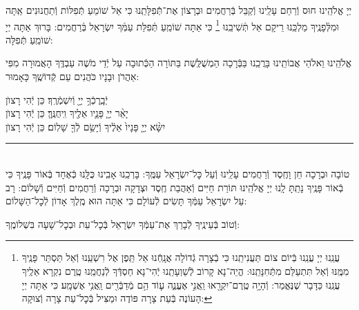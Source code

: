 \documentclass[twoside, openany, parskip=half, 11pt]{book}
\begin{document}
\weekdaysamalchus

יְיָ אֱלֹהֵֽינוּ חוּס וְֿרַחֵם עָלֵֽינוּ וְֿקַבֵּל בְּֿרַחֲמִים וּבְרָצוֹן אֶת־תְּֿֿפִלָּתֵֽנוּ כִּי אֵל שׁוֹמֵעַ תְּֿפִלּוֹת וְֿתַחֲנוּנִים אַֽתָּה וּמִלְּֿפָנֶֽיךָ מַלְכֵּֽנוּ רֵיקָם אַל תְּֿשִׁיבֵֽנוּ
\footnote{
עֲנֵֽנוּ יְיָ עֲנֵֽנוּ בְּֿיוֹם צוֹם תַּעֲנִיתֵֽנוּ כִּי בְֿצָרָה גְֿדוֹלָה אֲנָֽחְֿנוּ אַל תֵּֽפֶן אֶל רִשְׁעֵֽנוּ וְֿאַל תַּסְתֵּר פָּנֶֽיךָ מִמֶּֽנּוּ וְֿאַל תִּתְעַלַּם מִתְּֿחִנָּתֵֽנוּ: הֱיֵה־נָא קָרוֹב לְֿשַׁוְעָתֵֽנוּ יְֿהִי־נָא חַסְדְּֿךָ לְֿנַחֲמֵֽנוּ טֶֽרֶם נִקְרָא אֵלֶֽיךָ עֲנֵֽנוּ כַּדָּבָר שֶׁנֶּאֱמַר:
וְֿהָיָ֥ה טֶֽרֶם־יִקְרָ֖אוּ וַֽאֲנִ֣י אֶעֱנֶ֑ה ע֛וֹד הֵ֥ם מְֿדַבְּֿרִ֖ים וַֽאֲנִ֥י אֶשְׁמָֽע׃ כִּי אַתָּה יְיָ הָעוֹנֶה בְּֿעֵת צָרָה פּוֹדֶה וּמַצִּיל בְּֿכׇל־עֵת צָרָה וְֿצוּקָה:
}
כִּי אַתָּה שׁוֹמֵֽעַ תְּֿפִלַּת עַמְּֿךָ יִשְׂרָאֵל בְּֿרַחֲמִים: בָּרוּךְ אַתָּה יְיָ שׁוֹמֵֽעַ תְּֿפִלָּה:

\retzeh

\yaalehveyavo

\zion

\modim

\alhanisim

\weekdaysahodos

אֱלֹהֵֽינוּ וֵאלֹהֵי אֲבוֹתֵֽינוּ בָּרֲכֵֽנוּ בַּבְּֿרָכָה הַמְשֻׁלֶּֽשֶׁת בַּתּוֹרָה
הַכְּֿתוּבָה עַל יְֿדֵי מֹשֶׁה עַבְדֶּֽךָ הָאֲמוּרָה מִפִּי אַהֲרֹן וּבָנָיו כֹּהֲנִים עַם קְֿדוֹשֶֽׁךָ כָּאָמוּר:

יְֿבָֽרֶכְֿךָ֥ יְיָ֖ וְֿיִשְׁמְֿרֶֽךָ׃ \hfill \kahal כֵּן יְֿהִי רָצוׂן \\
יָאֵ֨ר יְיָ֧ פָּנָ֛יו אֵלֶ֖יךָ וִֽיחֻנֶּֽךָּ׃ \hfill \kahal כֵּן יְֿהִי רָצוׂן \\
יִשָּׂ֨א יְיָ֤ פָּנָיו֙ אֵלֶ֔יךָ וְֿיָשֵׂ֥ם לְֿךָ֖ שָׁלֽוֹם׃ \hfill \kahal כֵּן יְֿהִי רָצוׂן

\rule[-0.5ex]{3in}{1pt}

\begin{paracol}{2}
\\
טוֹבָה וּבְרָכָה חֵן וָחֶֽסֶד וְֿרַחֲמִים עָלֵֽינוּ וְֿעַל כׇּל־יִשְׂרָאֵל עַמֶּֽךָ: בָּרְכֵֽנוּ אָבִֽינוּ כֻּלָּֽנוּ כְּֿאֶחָד בְּֿאוֹר פָּנֶֽיךָ כִּי בְֿאוֹר פָּנֶֽיךָ נָתַֽתָּ לָֽנוּ יְיָ אֱלֹהֵֽינוּ תּוֹרַת חַיִּים וְֿאַהֲבַת חֶֽסֶד וּצְדָקָה וּבְרָכָה וְֿרַחֲמִים וְֿחַיִּים וְֿשָׁלוֹם:
\switchcolumn
{}
רָב עַל יִשְׂרָאֵל עַמְּֿךָ תָּשִׂים לְֿעוֹלָם כִּי אַתָּה הוּא מֶֽלֶךְ אָדוֹן לְֿכׇל־הַשָּׁלוֹם:
\end{paracol}
וְֿטוֹב בְּֿעֵינֶֽיךָ לְֿבָרֵךְ אֶת־עַמְּֿךָ יִשְׂרָאֵל בְּֿכׇל־עֵת וּבְכׇל־שָׁעָה בִּשְׁלוֹמֶֽךָ:
\end{document}
